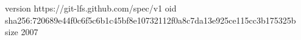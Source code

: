 version https://git-lfs.github.com/spec/v1
oid sha256:720689e44f0c6f5c6b1c45bf8e10732112f0a8c7da13e925ce115cc3b175325b
size 2007
